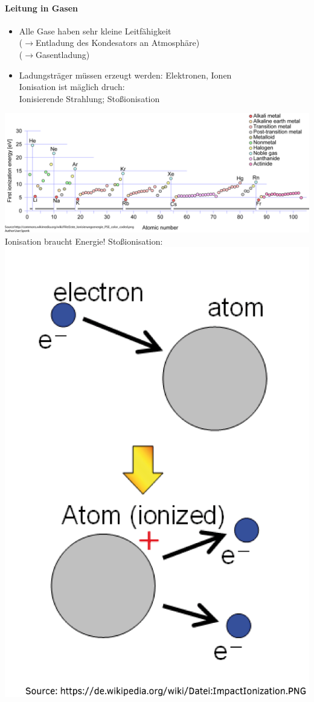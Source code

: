 \documentclass[11pt]{article}
\begin{document}
	\paragraph{Leitung in Gasen}
	\begin{itemize}
		\item Alle Gase haben sehr kleine Leitfähigkeit\\ ($ \longrightarrow $Entladung des Kondesators an Atmosphäre) \\ ($ \longrightarrow $Gasentladung)
		\item Ladungsträger müssen erzeugt werden: Elektronen, Ionen\\
		Ionisation ist mäglich druch:\\
		\indent Ionisierende Strahlung; Stoßionisation
	\end{itemize}
		\includegraphics[width=\linewidth]{skizzen/15/VL07/3}\\
	Ionisation braucht Energie!\hfill \break
	Stoßionisation:\\ \includegraphics[width=0.5\linewidth]{skizzen/15/VL07/4} \hfill \break
\end{document}
